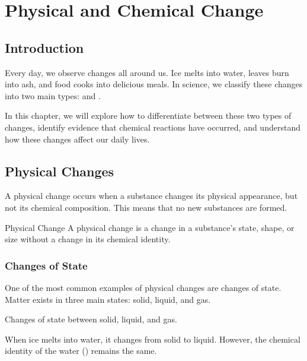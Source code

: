 \chapter{Physical and Chemical Change}

\section{Introduction}

Every day, we observe changes all around us. Ice melts into water, leaves burn into ash, and food cooks into delicious meals. In science, we classify these changes into two main types:  and .

In this chapter, we will explore how to differentiate between these two types of changes, identify evidence that chemical reactions have occurred, and understand how these changes affect our daily lives.

\section{Physical Changes}

A physical change occurs when a substance changes its physical appearance, but not its chemical composition. This means that no new substances are formed.

\begin{keyconcept}{Physical Change}
A physical change is a change in a substance's state, shape, or size without a change in its chemical identity.
\end{keyconcept}

\subsection{Changes of State}

One of the most common examples of physical changes are changes of state. Matter exists in three main states: solid, liquid, and gas. 

\begin{marginfigure}
\caption{Changes of state between solid, liquid, and gas.}
\label{fig:states}
\end{marginfigure}

\begin{example}
When ice melts into water, it changes from solid to liquid. However, the chemical identity of the water () remains the same.
\end{example}

